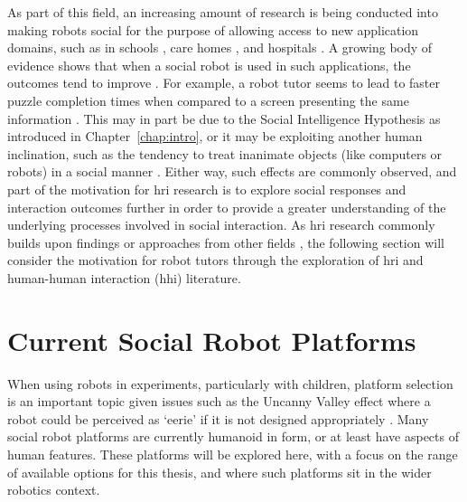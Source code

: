 As part of this field, an increasing amount of research is being conducted into making robots social for the purpose of allowing access to new application domains, such as in schools \citep{baxter2015wider}, care homes \citep{broekens2009assistive}, and hospitals \citep{coninx2015towards}. A growing body of evidence shows that when a social robot is used in such applications, the outcomes tend to improve \citep{li2015benefit}. For example, a robot tutor seems to lead to faster puzzle completion times when compared to a screen presenting the same information \citep{leyzberg2012physical}. This may in part be due to the Social Intelligence Hypothesis as introduced in Chapter~\ref{chap:intro}, or it may be exploiting another human inclination, such as the tendency to treat inanimate objects (like computers or robots) in a social manner \citep{reeves1996people}. Either way, such effects are commonly observed, and part of the motivation for \acrshort{hri} research is to explore social responses and interaction outcomes further in order to provide a greater understanding of the underlying processes involved in social interaction. As \acrshort{hri} research commonly builds upon findings or approaches from other fields \citep{baxter2016althri}, the following section will consider the motivation for robot tutors through the exploration of \acrshort{hri} and human-human interaction (\acrshort{hhi}) literature.

\section{Current Social Robot Platforms}\label{sec:background-platforms}
When using robots in experiments, particularly with children, platform selection is an important topic given issues such as the Uncanny Valley effect where a robot could be perceived as `eerie' if it is not designed appropriately \citep{moore2012bayesian,mori2012uncanny}. Many social robot platforms are currently humanoid in form, or at least have aspects of human features. These platforms will be explored here, with a focus on the range of available options for this thesis, and where such platforms sit in the wider robotics context.

